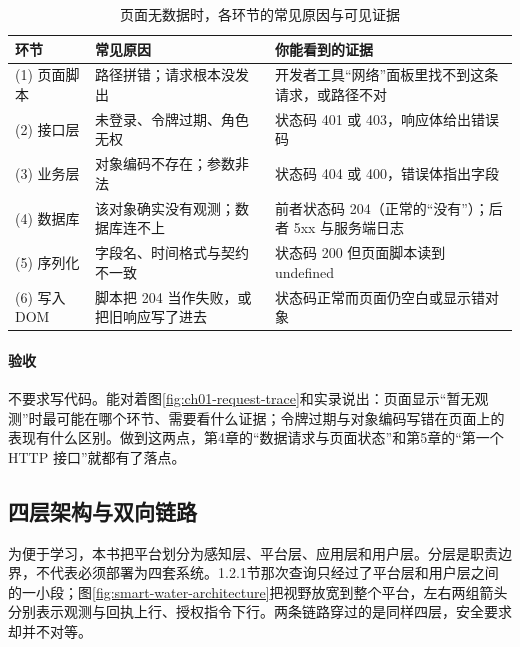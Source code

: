 \begin{table}[htbp]
\centering
\caption{页面无数据时，各环节的常见原因与可见证据}
\label{tab:ch01-request-failures}
\begin{tabular}{p{1.6cm}p{5.0cm}p{6.6cm}}
\toprule
环节 & 常见原因 & 你能看到的证据 \\
\midrule
(1) 页面脚本 & 路径拼错；请求根本没发出 & 开发者工具“网络”面板里找不到这条请求，或路径不对 \\
(2) 接口层 & 未登录、令牌过期、角色无权 & 状态码 401 或 403，响应体给出错误码 \\
(3) 业务层 & 对象编码不存在；参数非法 & 状态码 404 或 400，错误体指出字段 \\
(4) 数据库 & 该对象确实没有观测；数据库连不上 & 前者状态码 204（正常的“没有”）；后者 5xx 与服务端日志 \\
(5) 序列化 & 字段名、时间格式与契约不一致 & 状态码 200 但页面脚本读到 undefined \\
(6) 写入 DOM & 脚本把 204 当作失败，或把旧响应写了进去 & 状态码正常而页面仍空白或显示错对象 \\
\bottomrule
\end{tabular}
\end{table}

\paragraph{验收}不要求写代码。能对着图\ref{fig:ch01-request-trace}和实录说出：页面显示“暂无观测”时最可能在哪个环节、需要看什么证据；令牌过期与对象编码写错在页面上的表现有什么区别。做到这两点，第4章的“数据请求与页面状态”和第5章的“第一个 HTTP 接口”就都有了落点。

\subsection{四层架构与双向链路}

为便于学习，本书把平台划分为感知层、平台层、应用层和用户层。分层是职责边界，不代表必须部署为四套系统。1.2.1节那次查询只经过了平台层和用户层之间的一小段；图\ref{fig:smart-water-architecture}把视野放宽到整个平台，左右两组箭头分别表示观测与回执上行、授权指令下行。两条链路穿过的是同样四层，安全要求却并不对等。

